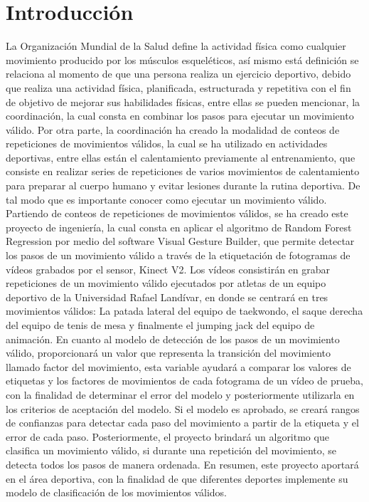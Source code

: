 \afterpage{\blankpage}
\newpage
\chapter{Introducci\'on}
La Organizaci\'on Mundial de la Salud define la actividad f\'isica como cualquier movimiento producido por los m\'usculos esquel\'eticos, as\'i mismo est\'a definici\'on se relaciona al momento de que una persona realiza un ejercicio deportivo, debido que realiza una actividad f\'isica,  planificada, estructurada y repetitiva con el fin de objetivo de mejorar sus habilidades f\'isicas, entre ellas se pueden mencionar, la coordinaci\'on, la cual consta en combinar los pasos para ejecutar un movimiento v\'alido.
\medbreak
Por otra parte, la coordinaci\'on ha creado la modalidad de conteos de repeticiones de movimientos   v\'alidos, la cual se ha utilizado en actividades  deportivas, entre ellas est\'an el calentamiento previamente al entrenamiento, que consiste en realizar series de repeticiones de varios movimientos de calentamiento para preparar al cuerpo humano y evitar lesiones durante la rutina deportiva. De tal modo que es importante conocer como ejecutar un movimiento v\'alido.
\medbreak
Partiendo de conteos de repeticiones de movimientos v\'alidos, se ha creado este proyecto de ingenier\'ia, la cual consta en aplicar el algoritmo de Random Forest Regression por medio del software Visual Gesture Builder, que permite detectar los pasos de un movimiento v\'alido a trav\'es de la etiquetaci\'on de fotogramas de v\'ideos grabados por el sensor, Kinect V2.
\medbreak
Los v\'ideos consistir\'an en grabar repeticiones de un movimiento v\'alido ejecutados por atletas de un equipo deportivo de la Universidad Rafael Land\'ivar, en donde se centrar\'a en tres movimientos v\'alidos: La patada lateral del equipo de taekwondo, el saque derecha del equipo de tenis de mesa y finalmente el jumping jack del equipo de animaci\'on.
\medbreak
En cuanto al modelo de detecci\'on de los pasos de un movimiento v\'alido, proporcionar\'a un valor que representa la transici\'on del movimiento llamado factor del movimiento, esta variable ayudar\'a a comparar los valores de etiquetas y los  factores de movimientos de cada fotograma de un v\'ideo de prueba, con la finalidad de determinar el error del modelo y posteriormente utilizarla en los criterios de aceptaci\'on del modelo.
\medbreak
Si el modelo es aprobado, se crear\'a rangos de confianzas para detectar cada paso del movimiento a partir de la etiqueta y el error de cada paso. Posteriormente, el proyecto brindar\'a un algoritmo que clasifica un movimiento v\'alido, si durante una repetici\'on del movimiento, se detecta todos los pasos de manera ordenada.
\medbreak
En resumen, este proyecto aportar\'a en el \'area deportiva, con la finalidad de que diferentes deportes implemente su modelo de clasificaci\'on de los movimientos v\'alidos.

